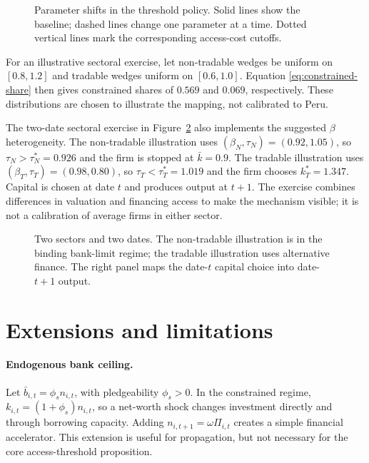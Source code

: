 \documentclass[11pt]{article}
\theoremstyle{definition}
\theoremstyle{remark}
\begin{document}
\begin{figure}[htbp]
\centering

\caption{Parameter shifts in the threshold policy. Solid lines show the
baseline; dashed lines change one parameter at a time. Dotted vertical lines
mark the corresponding access-cost cutoffs.}
\label{fig:parameter-shifts}
\end{figure}

For an illustrative sectoral exercise, let non-tradable wedges be uniform on
$[0.8,1.2]$ and tradable wedges uniform on $[0.6,1.0]$. Equation
\eqref{eq:constrained-share} then gives constrained shares of $0.569$ and
$0.069$, respectively. These distributions are chosen to illustrate the
mapping, not calibrated to Peru.

The two-date sectoral exercise in Figure~\ref{fig:two-sector-periods} also
implements the suggested $\beta$ heterogeneity. The non-tradable illustration
uses $(\beta_N,\tau_N)=(0.92,1.05)$, so
$\tau_N>\tau_N^*=0.926$ and the firm is stopped at $\bar k=0.9$. The tradable
illustration uses $(\beta_T,\tau_T)=(0.98,0.80)$, so
$\tau_T<\tau_T^*=1.019$ and the firm chooses $k_T^*=1.347$. Capital is chosen at
date $t$ and produces output at $t+1$. The exercise combines differences in
valuation and financing access to make the mechanism visible; it is not a
calibration of average firms in either sector.

\begin{figure}[H]
\centering

\caption{Two sectors and two dates. The non-tradable illustration is in the
binding bank-limit regime; the tradable illustration uses alternative finance.
The right panel maps the date-$t$ capital choice into date-$t+1$ output.}
\label{fig:two-sector-periods}
\end{figure}

\section{Extensions and limitations}\label{sec:extensions}

\paragraph{Endogenous bank ceiling.}
Let $\bar b_{i,t}=\phi_s n_{i,t}$, with pledgeability $\phi_s>0$. In the
constrained regime, $k_{i,t}=(1+\phi_s)n_{i,t}$, so a net-worth shock changes
investment directly and through borrowing capacity. Adding
$n_{i,t+1}=\omega\Pi_{i,t}$ creates a simple financial accelerator. This
extension is useful for propagation, but not necessary for the core
access-threshold proposition.
\end{document}
